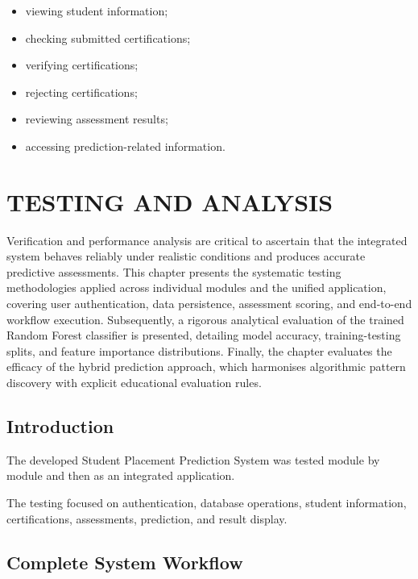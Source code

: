 \documentclass[12pt,a4paper]{report}
\begin{document}
\begin{itemize}
    \item viewing student information;
    \item checking submitted certifications;
    \item verifying certifications;
    \item rejecting certifications;
    \item reviewing assessment results;
    \item accessing prediction-related information.
\end{itemize}


\chapter{TESTING AND ANALYSIS}

Verification and performance analysis are critical to ascertain that the
integrated system behaves reliably under realistic conditions and produces
accurate predictive assessments. This chapter presents the systematic testing
methodologies applied across individual modules and the unified application,
covering user authentication, data persistence, assessment scoring, and end-to-end
workflow execution. Subsequently, a rigorous analytical evaluation of the
trained Random Forest classifier is presented, detailing model accuracy,
training-testing splits, and feature importance distributions. Finally, the
chapter evaluates the efficacy of the hybrid prediction approach, which
harmonises algorithmic pattern discovery with explicit educational evaluation
rules.

\section{Introduction}

The developed Student Placement Prediction System was tested
module by module and then as an integrated application.

The testing focused on authentication, database operations,
student information, certifications, assessments, prediction,
and result display.

\section{Complete System Workflow}
\end{document}
